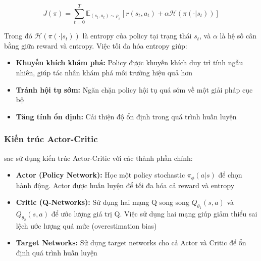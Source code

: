 \begin{equation}
    J(\pi) = \sum_{t=0}^{T} \mathbb{E}_{(s_t,a_t) \sim \rho_\pi} [r(s_t, a_t) + \alpha \mathcal{H}(\pi(\cdot|s_t))]
\end{equation}

Trong đó $\mathcal{H}(\pi(\cdot|s_t))$ là entropy của policy tại trạng thái $s_t$, và $\alpha$ là hệ số cân bằng giữa reward và entropy. Việc tối đa hóa entropy giúp:
\begin{itemize}
    \item \textbf{Khuyến khích khám phá:} Policy được khuyến khích duy trì tính ngẫu nhiên, giúp tác nhân khám phá môi trường hiệu quả hơn
    \item \textbf{Tránh hội tụ sớm:} Ngăn chặn policy hội tụ quá sớm về một giải pháp cục bộ
    \item \textbf{Tăng tính ổn định:} Cải thiện độ ổn định trong quá trình huấn luyện
\end{itemize}

\subsubsection{Kiến trúc Actor-Critic}
\ac{sac} sử dụng kiến trúc Actor-Critic với các thành phần chính:
\begin{itemize}
    \item \textbf{Actor (Policy Network):} Học một policy stochastic $\pi_\phi(a|s)$ để chọn hành động. Actor được huấn luyện để tối đa hóa cả reward và entropy
    \item \textbf{Critic (Q-Networks):} Sử dụng hai mạng Q song song $Q_{\theta_1}(s,a)$ và $Q_{\theta_2}(s,a)$ để ước lượng giá trị Q. Việc sử dụng hai mạng giúp giảm thiểu sai lệch ước lượng quá mức (overestimation bias)
    \item \textbf{Target Networks:} Sử dụng target networks cho cả Actor và Critic để ổn định quá trình huấn luyện
\end{itemize}

